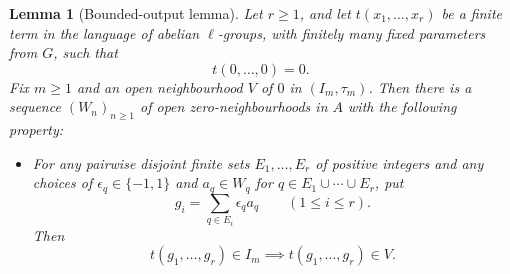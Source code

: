 \documentclass[preprint,3p]{elsarticle}
\theoremstyle{plain}
\newtheorem{lem}[thm]{Lemma}
\theoremstyle{definition}
\numberwithin{equation}{section}
\begin{document}
\begin{lem}[Bounded-output lemma]
\label{lem-strong-FBOT}
Let $r\geq1$, and let $t(x_1,\ldots,x_r)$ be a finite term in the language
of abelian $\ell$-groups, with finitely many fixed parameters from $G$,
such that
\begin{equation}
\label{eq-FBOT-zero}
 t(0,\ldots,0)=0.
\end{equation}
Fix $m\geq1$ and an open neighbourhood $V$ of $0$ in
$(I_m,\tau_m)$.  Then there is a sequence $(W_n)_{n\geq1}$ of 
open zero-neighbourhoods in $A$ with the following property:
\begin{itemize}
\item For any pairwise disjoint finite sets $E_1,\ldots,E_r$
of positive integers and any choices of $\epsilon_q\in\{-1,1\}$
and $a_q\in W_q$ for $q\in E_1\cup\cdots\cup E_r$, put
\[
 g_i=\sum_{q\in E_i}\epsilon_q a_q
 \qquad(1\leq i\leq r).
\]
Then
\[
 t(g_1,\ldots,g_r)\in I_m
 \implies
 t(g_1,\ldots,g_r)\in V.
\]
\end{itemize}
\end{lem}
\end{document}
